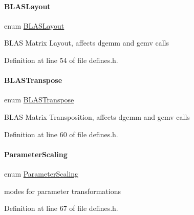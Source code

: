 \paragraph{\texorpdfstring{B\+L\+A\+S\+Layout}{BLASLayout}}
{\footnotesize\ttfamily enum \mbox{\hyperlink{namespaceamici_a3ec6460bb4e7f6100a15d18627a3ff3e}{B\+L\+A\+S\+Layout}}\hspace{0.3cm}{\ttfamily [strong]}}

B\+L\+AS Matrix Layout, affects dgemm and gemv calls 

Definition at line 54 of file defines.\+h.

\mbox{\label{namespaceamici_a0f0ec77c6c8f48d9c5cb50d54899afae}} 
\paragraph{\texorpdfstring{B\+L\+A\+S\+Transpose}{BLASTranspose}}
{\footnotesize\ttfamily enum \mbox{\hyperlink{namespaceamici_a0f0ec77c6c8f48d9c5cb50d54899afae}{B\+L\+A\+S\+Transpose}}\hspace{0.3cm}{\ttfamily [strong]}}

B\+L\+AS Matrix Transposition, affects dgemm and gemv calls 

Definition at line 60 of file defines.\+h.

\mbox{\label{namespaceamici_a42f062082226e9284c201d9eab71a3a0}} 
\paragraph{\texorpdfstring{Parameter\+Scaling}{ParameterScaling}}
{\footnotesize\ttfamily enum \mbox{\hyperlink{namespaceamici_a42f062082226e9284c201d9eab71a3a0}{Parameter\+Scaling}}\hspace{0.3cm}{\ttfamily [strong]}}

modes for parameter transformations 

Definition at line 67 of file defines.\+h.

\mbox{\label{namespaceamici_a2d77779286167d5603a870bf9f6c21ba}} 
